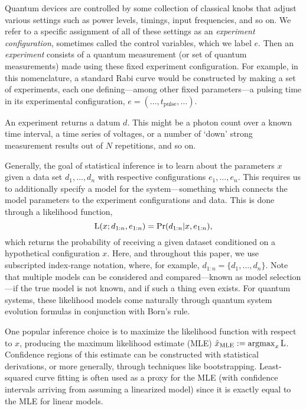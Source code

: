 \documentclass[aps,nofootinbib,twocolumn,superscriptaddress]{revtex4}
\newcommand{\mps}{x}
\newcommand{\eps}{e}
\newcommand{\data}{d}
\newcommand{\MLE}{\text{MLE}}
\begin{document}
Quantum devices are controlled by some collection of
classical knobs that adjust various settings
such as power levels, timings, input frequencies, and so on.
We refer to a specific assignment of all of these settings as an
\textit{experiment configuration}, sometimes called the control
variables, which we label $\eps$.
Then an \textit{experiment}
consists of a quantum measurement (or set of quantum measurements)
made using these fixed experiment configuration.
For example, in this nomenclature, a standard Rabi curve
would be constructed by making a set of
experiments, each one defining---among other fixed parameters---a
pulsing time in its experimental configuration,
$\eps=(\ldots,t_\text{pulse},\ldots)$.

An experiment returns a datum $\data$.
This might be a photon count
over a known time interval, a time series of voltages,
or a number of `down' strong measurement results out of $N$
repetitions, and so on.

Generally, the goal of statistical inference is to learn about the parameters
$\mps$ given a data set $\data_1,\ldots,\data_n$ with respective
configurations $\eps_1,\ldots,\eps_n$.
This requires us to additionally specify a model for the
system---something which connects the model parameters to the experiment
configurations and data.
This is done through a likelihood function,
\begin{equation}
    \Lhood(\mps;\data_{1:n},\eps_{1:n})
        = \Pr(\data_{1:n}|\mps,\eps_{1:n}),
    \label{eq:general-likelihood-function}
\end{equation}
which returns the probability of receiving a given dataset conditioned
on a hypothetical configuration $\mps$.
Here, and throughout this paper, we use subscripted index-range notation,
where, for example, $\data_{1:n}=\{\data_1,...,\data_n\}$.
Note that multiple models can be considered and compared---known
as model selection---if the
true model is not known, and if such a thing even exists.
For quantum systems, these likelihood models come naturally
through quantum system evolution formulas in conjunction
with Born's rule.

One popular inference choice is to maximize the likelihood function
with respect to $\mps$, producing the maximum likelihood estimate (MLE)
$\hat{\mps}_\MLE:=\operatorname{argmax}_\mps \Lhood$.
Confidence regions of this estimate can be constructed
with statistical derivations, or more generally, through techniques like bootstrapping.
Least-squared curve fitting is often used as a proxy for the MLE (with
confidence intervals arriving from assuming
a linearized model) since it is exactly equal to the MLE
for linear models.
\end{document}
